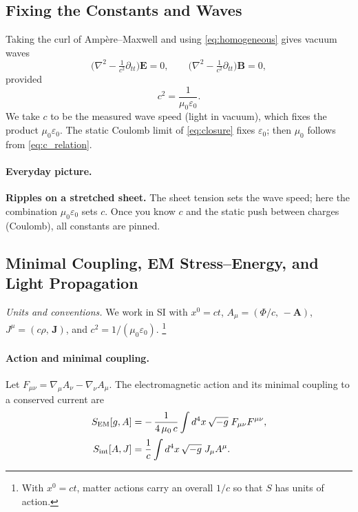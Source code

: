 \subsection{Fixing the Constants and Waves}
Taking the curl of Amp\`ere–Maxwell and using \eqref{eq:homogeneous} gives vacuum waves
\[
\big(\nabla^2 - \tfrac{1}{c^2}\partial_{tt}\big)\mathbf E=0,
\qquad
\big(\nabla^2 - \tfrac{1}{c^2}\partial_{tt}\big)\mathbf B=0,
\]
provided
\begin{equation}
c^2=\frac{1}{\mu_0\varepsilon_0}.
\label{eq:c_relation}
\end{equation}
We take $c$ to be the measured wave speed (light in vacuum), which fixes the product $\mu_0\varepsilon_0$. The static Coulomb limit of \eqref{eq:closure} fixes $\varepsilon_0$; then $\mu_0$ follows from \eqref{eq:c_relation}.

\paragraph{Everyday picture.}
\textbf{Ripples on a stretched sheet.} The sheet tension sets the wave speed; here the combination $\mu_0\varepsilon_0$ sets $c$. Once you know $c$ and the static push between charges (Coulomb), all constants are pinned.

\subsection{Minimal Coupling, EM Stress--Energy, and Light Propagation}
\label{subsec:minimal_coupling}

\noindent\textit{Units and conventions.} We work in SI with \(x^0 = c t\), \(A_\mu=(\Phi/c,\,-\mathbf{A})\), \(J^\mu=(c\rho,\,\mathbf{J})\), and \(c^2=1/(\mu_0\varepsilon_0)\).%
\footnote{With \(x^0=ct\), matter actions carry an overall \(1/c\) so that \(S\) has units of action.}

\paragraph{Action and minimal coupling.}
Let \(F_{\mu\nu}=\nabla_\mu A_\nu-\nabla_\nu A_\mu\). The electromagnetic action and its minimal coupling to a conserved current are
\begin{align}
S_{\rm EM}[g,A] &= -\,\frac{1}{4\,\mu_0\,c}\int d^4x\,\sqrt{-g}\;F_{\mu\nu}F^{\mu\nu}, \label{eq:SEM-fixed}\\[2pt]
S_{\rm int}[A,J] &= \frac{1}{c}\int d^4x\,\sqrt{-g}\; J_\mu A^\mu. \label{eq:Sint-fixed}
\end{align}

